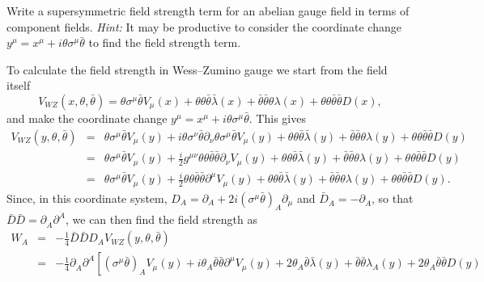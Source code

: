 \documentclass[notes.tex]{subfiles}
\begin{document}
\begin{Exercise}[]
\label{ex:abelian_field_strength}
Write a supersymmetric field strength term for an abelian gauge field in terms of component fields. {\it Hint:} It may be productive to consider the coordinate change $y^\mu=x^\mu + i\theta\sigma^\mu\bar\theta$ to find the field strength term. 
\end{Exercise}

\begin{Answer}
To calculate the field strength in Wess--Zumino gauge we start from the field itself
\begin{equation}
V_{WZ} (x, \theta, \bar{\theta}) = \theta\sigma^\mu \bar{\theta}V_\mu(x) + \theta\theta\bar{\theta}\bar{\lambda}(x) + \bar{\theta}\bar{\theta}\theta\lambda (x) + \theta\theta\bar{\theta}\bar{\theta}D(x),
\end{equation}
and make the coordinate change $y^\mu=x^\mu + i\theta\sigma^\mu\bar\theta$. This gives
\begin{eqnarray}
V_{WZ} (y, \theta, \bar{\theta}) &=& \theta\sigma^\mu \bar{\theta}V_\mu(y)+ i\theta\sigma^\nu\bar\theta\partial_\nu \theta\sigma^\mu \bar{\theta} V_\mu(y)  + \theta\theta\bar{\theta}\bar{\lambda}(y) + \bar{\theta}\bar{\theta}\theta\lambda (y) + \theta\theta\bar{\theta}\bar{\theta}D(y) \nonumber\\
&=& \theta\sigma^\mu \bar{\theta}V_\mu(y)+ \frac{i}{2}g^{\mu\nu}\theta\theta \bar\theta\bar\theta\partial_\nu V_\mu(y)  + \theta\theta\bar{\theta}\bar{\lambda}(y) + \bar{\theta}\bar{\theta}\theta\lambda (y) + \theta\theta\bar{\theta}\bar{\theta}D(y)\nonumber\\
&=& \theta\sigma^\mu \bar{\theta}V_\mu(y)+ \frac{i}{2}\theta\theta \bar\theta\bar\theta\partial^\mu V_\mu(y)  + \theta\theta\bar{\theta}\bar{\lambda}(y) + \bar{\theta}\bar{\theta}\theta\lambda (y) + \theta\theta\bar{\theta}\bar{\theta}D(y).
\end{eqnarray}
Since, in this coordinate system, $D_A=\partial_A+2i(\sigma^\mu\bar\theta)_A\partial_\mu$ and $\bar D_{\dot A}=-\partial_{\dot A}$, so that $\bar D \bar D=\partial_{\dot A}\partial^{\dot A}$, we can then find the field strength as
\begin{eqnarray}
W_A&=& -\frac{1}{4} \bar D \bar D D_A V_{WZ} (y, \theta, \bar{\theta}) \nonumber\\
&=& -\frac{1}{4}\partial_{\dot A}\partial^{\dot A} \left[
(\sigma^\mu\bar\theta)_AV_\mu(y)+ i\theta_A\bar\theta\bar\theta\partial^\mu V_\mu(y)  + 2\theta_A\bar\theta\bar\lambda(y) + \bar\theta\bar\theta\lambda_A(y) + 2\theta_A\bar\theta\bar\theta D(y) \right. \nonumber\\

\end{eqnarray}
\end{Answer}
\end{document}
